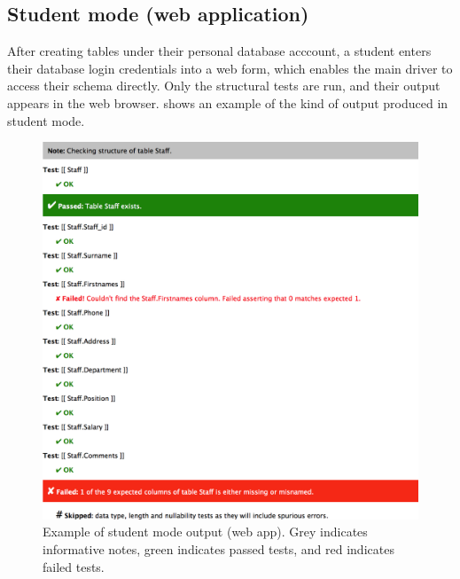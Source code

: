 \documentclass[sigconf, authordraft, capitalise]{acmart}
\begin{document}



\subsection{Student mode (web application)}

After creating tables under their personal database acccount, a student enters their database login credentials into a web form, which enables the main driver to access their schema directly. Only the structural tests are run, and their output appears in the web browser.  shows an example of the kind of output produced in student mode.

\begin{figure}
    \includegraphics[width=0.95\columnwidth,keepaspectratio]{images/web_output.png}
    \caption{Example of student mode output (web app). Grey indicates informative notes, green indicates passed tests, and red indicates failed tests.}
    \label{fig-student-output}
\end{figure}
\end{document}
